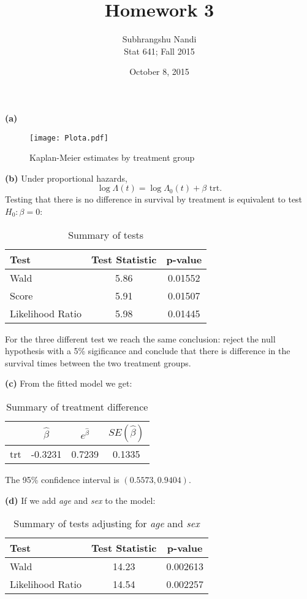 \documentclass[11pt,a4paper]{article}
\begin{document}
\title{Homework 3}
\author{Subhrangshu Nandi\\
  Stat 641; Fall 2015}
\date{October 8, 2015}

\maketitle

\noindent
\textbf{(a)} 
\begin{figure}[H]
\centering
\texttt{[image: Plota.pdf]}
\vspace{-0.5cm}
\caption{Kaplan-Meier estimates by treatment group}
\end{figure}

\noindent
\textbf{(b)} 
Under proportional hazards, $$\log \Lambda (t)=\log \Lambda_0 (t)+\beta \text{ trt}.$$
Testing that there is no difference in survival by treatment is equivalent to test $H_0:\beta=0$:

\begin{table}[H]
\centering
\begin{tabular}{lcc}
  \hline
Test &Test Statistic & p-value \\
\hline
Wald&5.86&0.01552\\
Score&5.91&0.01507\\
Likelihood Ratio & 5.98  &0.01445 \\
   \hline
\end{tabular}
\caption{Summary of tests}
\end{table}

For the three different test we reach the same conclusion: reject the null hypothesis with a 5\% sigificance and conclude that there is difference in the survival times between the two treatment groups.

\noindent
\textbf{(c)} 
From the fitted model we get:

\begin{table}[H]
\centering
\begin{tabular}{lccc}
  \hline
    &  $\hat{\beta}$ & $e^{\hat{\beta}}$ &$SE(\hat{\beta})$ \\ 
   \hline 
trt &-0.3231 &   0.7239 &  0.1335 \\
   \hline
\end{tabular}
\caption{Summary of treatment difference}
\end{table}
The 95\% confidence interval is $(0.5573, 0.9404)$.

\noindent
\textbf{(d)} If we add \emph{age} and \emph{sex} to the model:
\begin{table}[H]
\centering
\begin{tabular}{lcc}
  \hline
Test &Test Statistic & p-value \\
\hline
Wald& 14.23 & 0.002613 \\
Likelihood Ratio&  14.54 & 0.002257 \\
\hline
\end{tabular}
\caption{Summary of tests adjusting for \emph{age} and \emph{sex}}
\end{table}
\end{document}
